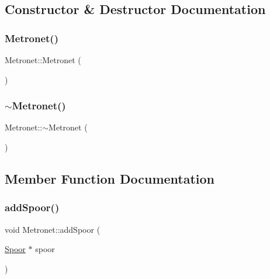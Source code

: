 \subsection{Constructor \& Destructor Documentation}
\mbox{\label{class_metronet_abdd205c39857ed1aabd104a6886cad45}} 
\subsubsection{\texorpdfstring{Metronet()}{Metronet()}}
{\footnotesize\ttfamily Metronet\+::\+Metronet (\begin{DoxyParamCaption}{ }\end{DoxyParamCaption})}

\mbox{\label{class_metronet_afa96be4bf66f8d7dcf3f40a7487d2ea7}} 
\subsubsection{\texorpdfstring{$\sim$\+Metronet()}{~Metronet()}}
{\footnotesize\ttfamily Metronet\+::$\sim$\+Metronet (\begin{DoxyParamCaption}{ }\end{DoxyParamCaption})\hspace{0.3cm}{\ttfamily [virtual]}}



\subsection{Member Function Documentation}
\mbox{\label{class_metronet_a499d8ac62450fec83bc10101de53cd76}} 
\subsubsection{\texorpdfstring{add\+Spoor()}{addSpoor()}}
{\footnotesize\ttfamily void Metronet\+::add\+Spoor (\begin{DoxyParamCaption}\item[{\hyperlink{class_spoor}{Spoor} $\ast$}]{spoor }\end{DoxyParamCaption})}



